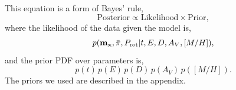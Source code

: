 \documentclass[useAMS, usenatbib, preprint, 12pt]{aastex}
\begin{document}
This equation is a form of Bayes' rule,
\begin{equation} \label{eqn:eqn2}
\mathrm{Posterior} \propto \mathrm{Likelihood} \times \mathrm{Prior},
\end{equation}
where the likelihood of the data given the model is,
\begin{equation} \label{eqn:full_likelihood}
    p({\bf m_x}, \bar{\pi}, P_{\mathrm{rot}}|t, E, D, A_V, [M/H]),
\end{equation}
and the prior PDF over parameters is,
\begin{equation} \label{eqn:prior}
    p(t)\, p(E)\, p(D)\, p(A_V)\, p([M/H]).
\end{equation}
The priors we used are described in the appendix.
\end{document}
